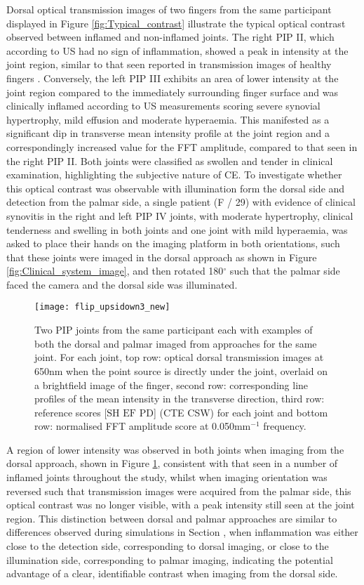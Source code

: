 \documentclass[twoside]{bhamthesis}
\theoremstyle{definition}
\begin{document}
Dorsal optical transmission images of two fingers from the same participant displayed in Figure \ref{fig:Typical_contrast} illustrate the typical optical contrast observed between inflamed and non-inflamed joints. The right PIP II, which according to US had no sign of inflammation, showed a peak in intensity at the joint region, similar to that seen reported in transmission images of healthy fingers \cite{lighter2018multispectral}. Conversely, the left PIP III exhibits an area of lower intensity at the joint region compared to the immediately surrounding finger surface and was clinically inflamed according to US measurements scoring severe synovial hypertrophy, mild effusion and moderate hyperaemia. This manifested as a significant dip in transverse mean intensity profile at the joint region and a correspondingly increased value for the FFT amplitude, compared to that seen in the right PIP II. Both joints were classified as swollen and tender in clinical examination, highlighting the subjective nature of CE. 
To investigate whether this optical contrast was observable with illumination form the dorsal side and detection from the palmar side, a single patient (F / 29) with evidence of clinical synovitis in the right and left PIP IV joints, with moderate hypertrophy, clinical tenderness and swelling in both joints and one joint with mild hyperaemia, was asked to place their hands on the imaging platform in both orientations, such that these joints were imaged in the dorsal approach as shown in Figure \ref{fig:Clinical_system_image}, and then rotated 180$^\circ$ such that the palmar side faced the camera and the dorsal side was illuminated.

\begin{figure}[!ht]
\centering\texttt{[image: flip\_upsidown3\_new]}\caption{Two PIP joints from the same participant each with examples of both the dorsal and palmar imaged from approaches for the same joint. For each joint, top row: optical dorsal transmission images at 650nm when the point source is directly under the joint, overlaid on a brightfield image of the finger, second row: corresponding line profiles of the mean intensity in the transverse direction, third row: reference scores  [$\mathrm{SH}$ $\mathrm{EF}$ $\mathrm{PD}$] (CTE CSW) for each joint and bottom row: normalised FFT amplitude score at 0.050mm$^{-1}$ frequency.}
  \label{fig:spectral_change}
\end{figure}

A region of lower intensity was observed in both joints when imaging from the dorsal approach, shown in  Figure \ref{fig:spectral_change}, consistent with that seen in a number of inflamed joints throughout the study, whilst when imaging orientation was reversed such that transmission images were acquired from the palmar side, this optical contrast was no longer visible, with a peak intensity still seen at the joint region. This distinction between dorsal and palmar approaches are similar to differences observed during simulations in Section , when inflammation was either close to the detection side, corresponding to dorsal imaging, or close to the illumination side, corresponding to palmar imaging, indicating the potential advantage of a clear, identifiable contrast when imaging from the dorsal side. 
\end{document}
